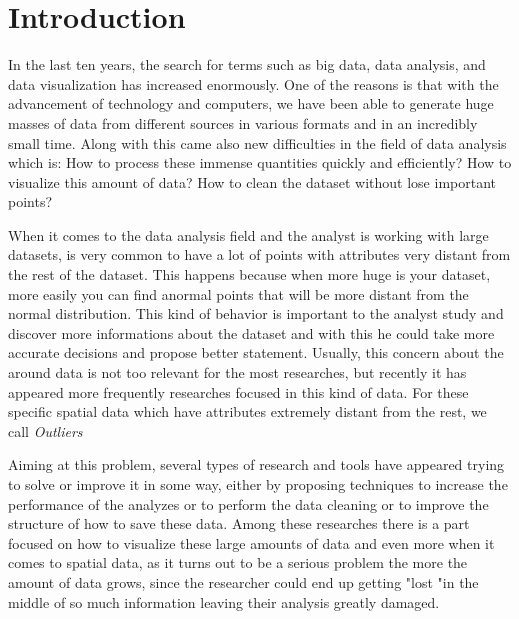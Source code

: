\chapter{Introduction}


In the last ten years, the search for terms such as big data, data analysis, and
data visualization has increased enormously. One of the reasons is that with the
advancement of technology and computers, we have been able to generate huge masses 
of data from different sources in various formats and in an incredibly small time.
Along with this came also new difficulties in the field of data analysis which is:
How to process these immense quantities quickly and efficiently? How to visualize
this amount of data? How to clean the dataset without lose important points?

When it comes to the data analysis field and the analyst is working with large 
datasets, is very common to have a lot of points with attributes very distant from
the rest of the dataset. This happens because when more huge is your dataset, more
easily you can find anormal points that will be more distant from the normal
distribution. This kind of behavior is important to the analyst study and discover
more informations about the dataset and with this he could take more accurate
decisions and propose better statement. Usually, this concern about the around
data is not too relevant for the most researches, but recently it has appeared
more frequently researches focused in this kind of data. For these specific spatial
data which have attributes extremely distant from the rest, we call \textit{Outliers}



Aiming at this problem, several types of research and tools have appeared trying to
solve or improve it in some way, either by proposing techniques to increase 
the performance of the analyzes or to perform the data cleaning or to improve the 
structure of how to save these data. Among these researches there is a part focused 
on how to visualize these large amounts of data and even more when it comes to 
spatial data, as it turns out to be a serious problem the more the amount of data 
grows, since the researcher could end up getting "lost "in the middle of so much 
information leaving their analysis greatly damaged.

